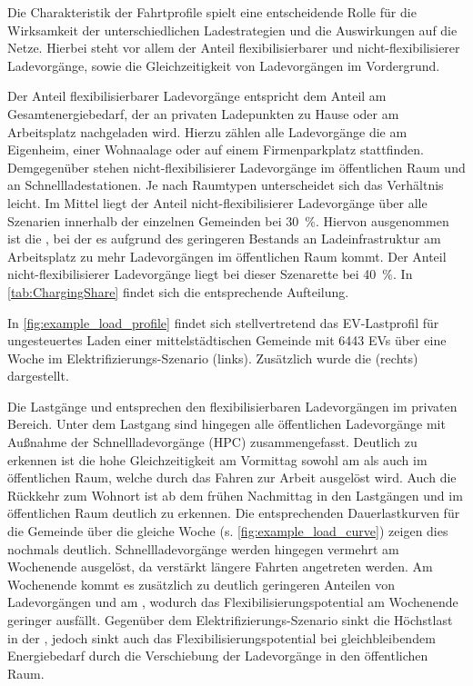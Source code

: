 Die Charakteristik der Fahrtprofile spielt eine entscheidende Rolle für die Wirksamkeit der unterschiedlichen Ladestrategien und die Auswirkungen auf die Netze.
Hierbei steht vor allem der Anteil flexibilisierbarer und nicht-flexibilisierer Ladevorgänge, sowie die Gleichzeitigkeit von Ladevorgängen im Vordergrund.\medskip

Der Anteil flexibilisierbarer Ladevorgänge entspricht dem Anteil am Gesamtenergiebedarf, der an privaten Ladepunkten zu Hause oder am Arbeitsplatz nachgeladen wird.
Hierzu zählen alle Ladevorgänge die am Eigenheim, einer Wohnaalage oder auf einem Firmenparkplatz stattfinden.
Demgegenüber stehen nicht-flexibilisierer Ladevorgänge im öffentlichen Raum und an Schnellladestationen.
Je nach Raumtypen unterscheidet sich das Verhältnis leicht.
Im Mittel liegt der Anteil nicht-flexibilisierer Ladevorgänge über alle Szenarien innerhalb der einzelnen Gemeinden bei \SI{30}{\percent}.
Hiervon ausgenommen ist die \SzeFirmenparkplatzdot, bei der es aufgrund des geringeren Bestands an Ladeinfrastruktur am Arbeitsplatz zu mehr Ladevorgängen im öffentlichen Raum kommt.
Der Anteil nicht-flexibilisierer Ladevorgänge liegt bei dieser Szenarette bei \SI{40}{\percent}.
In \autoref{tab:ChargingShare} findet sich die entsprechende Aufteilung.



In \autoref{fig:example_load_profile} findet sich stellvertretend das \gls{EV}-Lastprofil für ungesteuertes Laden einer mittelstädtischen Gemeinde mit \num{6443} \glspl{EV} über eine Woche im Elektrifizierungs-Szenario (links).
Zusätzlich wurde die \SzeFirmenparkplatz (rechts) dargestellt.



Die Lastgänge \zH und \Firmeparkplatz entsprechen den flexibilisierbaren Ladevorgängen im privaten Bereich. Unter dem Lastgang \oeffen sind hingegen alle öffentlichen Ladevorgänge mit Außnahme der Schnellladevorgänge (\gls{HPC}) zusammengefasst. Deutlich zu erkennen ist die hohe Gleichzeitigkeit am Vormittag sowohl am \Firmeparkplatz als auch im öffentlichen Raum, welche durch das Fahren zur Arbeit ausgelöst wird.
Auch die Rückkehr zum Wohnort ist ab dem frühen Nachmittag in den Lastgängen \zH und im öffentlichen Raum deutlich zu erkennen. Die entsprechenden Dauerlastkurven für die Gemeinde über die gleiche Woche (s. \autoref{fig:example_load_curve}) zeigen dies nochmals deutlich.
Schnellladevorgänge werden hingegen vermehrt am Wochenende ausgelöst, da verstärkt längere Fahrten angetreten werden.
Am Wochenende kommt es zusätzlich zu deutlich geringeren Anteilen von Ladevorgängen \zH und am \Firmeparkplatzdot, wodurch das Flexibilisierungspotential am Wochenende geringer ausfällt.
Gegenüber dem Elektrifizierungs-Szenario sinkt die Höchstlast in der \SzeFirmenparkplatzdot, jedoch sinkt auch das Flexibilisierungspotential bei gleichbleibendem Energiebedarf durch die Verschiebung der Ladevorgänge in den öffentlichen Raum.

